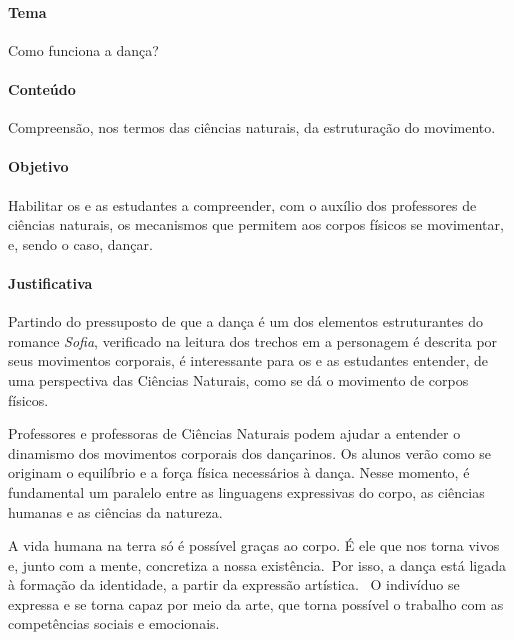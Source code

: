 \documentclass[12pt]{extarticle}
\begin{document}
\paragraph{Tema} Como funciona a dança?

\paragraph{Conteúdo} Compreensão, nos termos das ciências naturais, da estruturação do movimento.

\paragraph{Objetivo} Habilitar os e as estudantes a compreender, com o auxílio dos professores
de ciências naturais, os mecanismos que permitem aos corpos físicos se movimentar, e, sendo o caso,
dançar.

\paragraph{Justificativa} Partindo do pressuposto de que a dança é um dos elementos estruturantes
do romance \textit{Sofia}, verificado na leitura dos trechos em a personagem é descrita por seus
movimentos corporais, é interessante para os e as estudantes entender, de uma perspectiva
das Ciências Naturais, como se dá o movimento de corpos físicos. 

Professores e professoras de Ciências Naturais podem ajudar a
entender o dinamismo dos movimentos corporais dos dançarinos. Os alunos verão
como se originam o equilíbrio e a força física necessários à dança. Nesse momento, é fundamental
um paralelo entre as linguagens expressivas do corpo, as ciências humanas e as
ciências da natureza. 

A vida humana na terra só é possível graças ao corpo. É
ele que nos torna vivos e, junto com a mente, concretiza a nossa existência. Por isso, a dança está ligada à formação da identidade, a partir da expressão
artística.  O indivíduo se expressa e se torna capaz por meio da arte, que
torna possível o trabalho com as competências sociais e emocionais.
\end{document}
